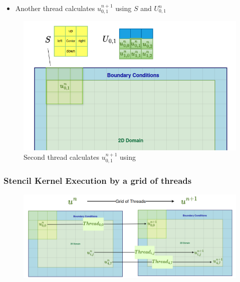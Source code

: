 \documentclass[9pt]{beamer}
\begin{document}
\begin{frame}
\vspace{-0.9\baselineskip}
    \begin{itemize}
        \item Another thread calculates $u_{0,1}^{n+1}$  using $S$ and $U^{n}_{0,1}$
    \end{itemize}
    \begin{figure}
        \centering
        \includegraphics[width=0.8\linewidth]{Screenshot from 2024-09-21 23-44-50.png}
        \caption{Second thread calculates $u_{0,1}^{n+1}$ using }
        \label{fig:enter-label}
    \end{figure}
\end{frame}

\begin{frame}
\frametitle{Stencil Kernel Execution by a grid of threads}
\begin{figure}
    \centering
    \includegraphics[width=0.86\linewidth]{Screenshot from 2024-09-19 23-09-33.png}
\end{figure}
\end{frame}
\end{document}
